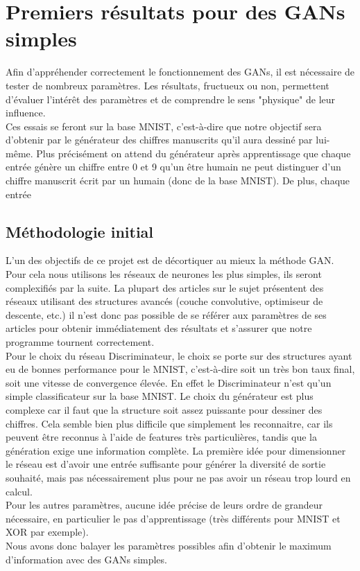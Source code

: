 \section{Premiers résultats pour des GANs simples}
	Afin d'appréhender correctement le fonctionnement des GANs, il est nécessaire de tester de nombreux paramètres. Les résultats, fructueux ou non, permettent d'évaluer l'intérêt des paramètres et de comprendre le sens "physique" de leur influence.\\
	Ces essais se feront sur la base MNIST, c'est-à-dire que notre objectif sera d'obtenir par le générateur des chiffres manuscrits qu'il aura dessiné par lui-même. Plus précisément on attend du générateur après apprentissage que chaque entrée génère un chiffre entre 0 et 9 qu'un être humain ne peut distinguer d'un chiffre manuscrit écrit par un humain (donc de la base MNIST). De plus, chaque entrée 

	\subsection{Méthodologie initial}
		L'un des objectifs de ce projet est de décortiquer au mieux la méthode GAN. Pour cela nous utilisons les réseaux de neurones les plus simples, ils seront complexifiés par la suite. La plupart des articles sur le sujet présentent des réseaux utilisant des structures avancés (couche convolutive, optimiseur de descente, etc.) il n'est donc pas possible de se référer aux paramètres de ses articles pour obtenir immédiatement des résultats et s'assurer que notre programme tournent correctement. \\
		Pour le choix du réseau Discriminateur, le choix se porte sur des structures ayant eu de bonnes performance pour le MNIST, c'est-à-dire soit un très bon taux final, soit une vitesse de convergence élevée. En effet le Discriminateur n'est qu'un simple classificateur sur la base MNIST. Le choix du générateur est plus complexe car il faut que la structure soit assez puissante pour dessiner des chiffres. Cela semble bien plus difficile que simplement les reconnaitre, car ils peuvent être reconnus à l'aide de features très particulières, tandis que la génération exige une information complète. La première idée pour dimensionner le réseau est d'avoir une entrée suffisante pour générer la diversité de sortie souhaité, mais pas nécessairement plus pour ne pas avoir un réseau trop lourd en calcul.\\
		Pour les autres paramètres, aucune idée précise de leurs ordre de grandeur nécessaire, en particulier le pas d'apprentissage (très différents pour MNIST et XOR par exemple).\\
		Nous avons donc balayer les paramètres possibles afin d'obtenir le maximum d'information avec des GANs simples.




